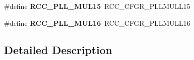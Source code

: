 \begin{DoxyCompactItemize}
\item 
\mbox{\label{group___r_c_c_ex___p_l_l___multiplication___factor_gaa75ceb816d75a0d384b67d1bf489bb44}} 
\#define {\bfseries R\+C\+C\+\_\+\+P\+L\+L\+\_\+\+M\+U\+L15}~R\+C\+C\+\_\+\+C\+F\+G\+R\+\_\+\+P\+L\+L\+M\+U\+L\+L15
\item 
\mbox{\label{group___r_c_c_ex___p_l_l___multiplication___factor_ga39bd735dbbdf7f4bbc122b833d2c92f3}} 
\#define {\bfseries R\+C\+C\+\_\+\+P\+L\+L\+\_\+\+M\+U\+L16}~R\+C\+C\+\_\+\+C\+F\+G\+R\+\_\+\+P\+L\+L\+M\+U\+L\+L16
\end{DoxyCompactItemize}


\subsection{Detailed Description}
